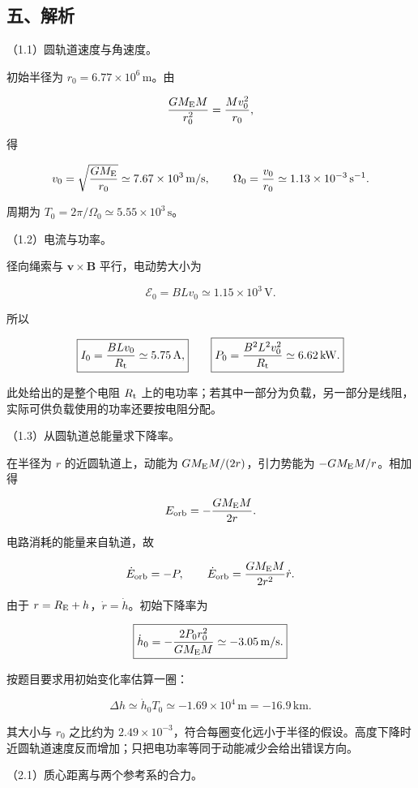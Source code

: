 \documentclass[12pt,a4paper,fontset=fandol]{ctexart}
\begin{document}
\subsection{五、解析}\label{ux4e94ux89e3ux6790-3}

（1.1）圆轨道速度与角速度。

初始半径为 \(r_0=6.77\times10^6\,\mathrm m\)。由

\[
\frac{GM_{\rm E}M}{r_0^2}=\frac{Mv_0^2}{r_0},
\]

得

\[
v_0=\sqrt{\frac{GM_{\rm E}}{r_0}}
\simeq7.67\times10^3\,\mathrm{m/s},\qquad
\Omega_0=\frac{v_0}{r_0}
\simeq1.13\times10^{-3}\,\mathrm{s^{-1}}.
\]

周期为 \(T_0=2\pi/\Omega_0\simeq5.55\times10^3\,\mathrm s\)。

（1.2）电流与功率。

径向绳索与 \(\boldsymbol v\times\boldsymbol B\) 平行，电动势大小为

\[
\mathcal E_0=BLv_0\simeq1.15\times10^3\,\mathrm V.
\]

所以

\[
\boxed{I_0=\frac{BLv_0}{R_{\rm t}}\simeq5.75\,\mathrm A,}
\qquad
\boxed{P_0=\frac{B^2L^2v_0^2}{R_{\rm t}}\simeq6.62\,\mathrm{kW}.}
\]

此处给出的是整个电阻 \(R_{\rm t}\)
上的电功率；若其中一部分为负载，另一部分是线阻，实际可供负载使用的功率还要按电阻分配。

（1.3）从圆轨道总能量求下降率。

在半径为 \(r\) 的近圆轨道上，动能为 \(GM_{\rm E}M/(2r)\)，引力势能为
\(-GM_{\rm E}M/r\)。相加得

\[
E_{\rm orb}=-\frac{GM_{\rm E}M}{2r}.
\]

电路消耗的能量来自轨道，故

\[
\dot E_{\rm orb}=-P,\qquad
\dot E_{\rm orb}=\frac{GM_{\rm E}M}{2r^2}\dot r.
\]

由于 \(r=R_{\rm E}+h\)，\(\dot r=\dot h\)。初始下降率为

\[
\boxed{\dot h_0=-\frac{2P_0r_0^2}{GM_{\rm E}M}
\simeq-3.05\,\mathrm{m/s}.}
\]

按题目要求用初始变化率估算一圈：

\[
\boxed{\Delta h\simeq\dot h_0T_0\simeq-1.69\times10^4\,\mathrm m
=-16.9\,\mathrm{km}.}
\]

其大小与 \(r_0\) 之比约为
\(2.49\times10^{-3}\)，符合每圈变化远小于半径的假设。高度下降时近圆轨道速度反而增加；只把电功率等同于动能减少会给出错误方向。

（2.1）质心距离与两个参考系的合力。
\end{document}
